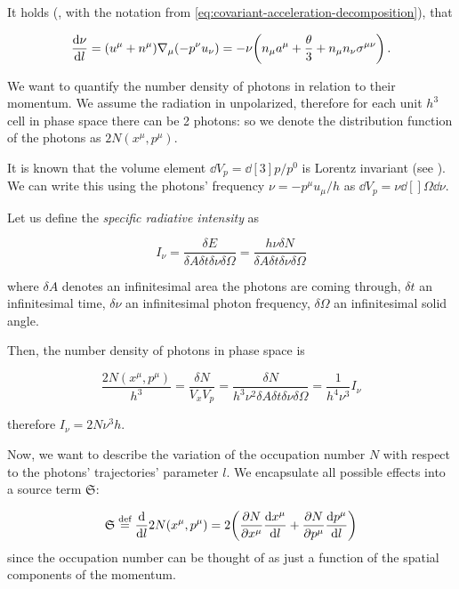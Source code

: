 \documentclass[main.tex]{subfiles}
\begin{document}
It holds (\cite[eq. 2.17]{Thorne:1981feb}, with the notation from \eqref{eq:covariant-acceleration-decomposition}), that

\begin{equation}
  \dv{\nu}{l}  = (u^\mu + n^\mu) \nabla_\mu (-p^\nu u_\nu) = - \nu \qty(n_\mu a^\mu  + \frac{\theta}{3} + n_\mu n_\nu \sigma^{\mu\nu})\,.
\end{equation}

We want to quantify the number density of photons in relation to their momentum. We assume the radiation in unpolarized, therefore for each unit \(h^3\) cell in phase space there can be 2 photons: so we denote the distribution function of the photons as \(2N (x^\mu, p^\mu)\).

It is known that the volume element \(\dd{V}_p = \dd[3]{p} / p^0 \) is Lorentz invariant (see \cite[box 22.5]{MisnerThorneWheeler:1973}).
We can write this using the photons' frequency \(\nu = - p^\mu u_\mu / h\) as \(\dd{V}_p = \nu \dd[]{\Omega} \dd{\nu} \).

Let us define the \emph{specific radiative intensity} as

\begin{equation}
  I_\nu = \frac{\delta E}{\delta A \delta  t \delta \nu \delta \Omega}
  = \frac{h \nu \delta N}{\delta A \delta  t \delta \nu \delta \Omega}
\end{equation}

where \(\delta A\) denotes an infinitesimal area the photons are coming through, \(\delta t\) an infinitesimal time, \(\delta \nu\) an infinitesimal photon frequency, \(\delta \Omega\) an infinitesimal solid angle.

Then, the number density of photons in phase space is \cite[figure 22.2]{MisnerThorneWheeler:1973}

\begin{equation}
  \frac{2N(x^\mu, p^\mu)}{h^3} = \frac{\delta N}{V_x V_p} =  \frac{\delta N}{h^3 \nu^2\delta A \delta  t \delta \nu \delta \Omega} = \frac{1}{h^4 \nu^3} I_\nu
\end{equation}

therefore \(I_\nu = 2 N \nu^3 h\).

Now, we want to describe the variation of the occupation number \(N\) with respect to the photons' trajectories' parameter \(l\). We encapsulate all possible effects into a source term \(\mathfrak S\):

\begin{equation}
    \mathfrak S \stackrel{\text{def}}{=} \dv{}{l} 2N(x^\mu, p^\mu) =
    2 \qty(\pdv{N}{x^\mu} \dv{x^\mu}{l} + \pdv{N}{p^\mu} \dv{p^\mu}{l}  )
\end{equation}
since the occupation number can be thought of as just a function of the spatial components of the momentum.
\end{document}
